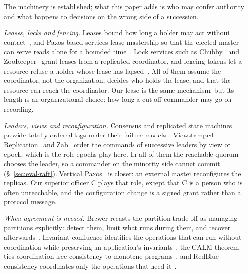 The machinery is established; what this paper adds is who may confer authority and what
happens to decisions on the wrong side of a succession.

\textit{Leases, locks and fencing.} Leases bound how long a holder may act without
contact~\cite{gray1989leases}, and Paxos-based services lease mastership so that the
elected master can serve reads alone for a bounded time~\cite{chandra2007paxoslive}. Lock
services such as Chubby~\cite{burrows2006chubby} and
ZooKeeper~\cite{hunt2010zookeeper} grant leases from a replicated coordinator, and fencing
tokens let a resource refuse a holder whose lease has lapsed~\cite{kleppmann2017ddia}.
All of them assume the coordinator, not the organization, decides who holds the lease, and
that the resource can reach the coordinator. Our lease is the same mechanism, but its
length is an organizational choice: how long a cut-off commander may go on recording.

\textit{Leaders, views and reconfiguration.} Consensus and replicated state machines
provide totally ordered logs under their failure
models~\cite{lamport1998parttime,ongaro2014raft,balakrishnan2013tango,vanrenesse2004chain}.
Viewstamped Replication~\cite{oki1988viewstamped} and Zab~\cite{junqueira2011zab} order
the commands of successive leaders by view or epoch, which is the role epochs play here.
In all of them the reachable quorum chooses the leader, so a commander on the minority
side cannot commit (\S~\ref{sec:eval-raft}). Vertical Paxos~\cite{lamport2009vertical} is
closer: an external master reconfigures the replicas. Our superior officer C plays that
role, except that C is a person who is often unreachable, and the configuration change is
a signed grant rather than a protocol message.

\textit{When agreement is needed.} Brewer recasts the partition trade-off as managing
partitions explicitly: detect them, limit what runs during them, and recover
afterwards~\cite{brewer2012cap}. Invariant confluence identifies the operations that can
run without coordination while preserving an application's
invariants~\cite{bailis2014coordination}, the CALM theorem ties coordination-free
consistency to monotone programs~\cite{hellerstein2020calm}, and RedBlue consistency
coordinates only the operations that need it~\cite{li2012redblue}. 

